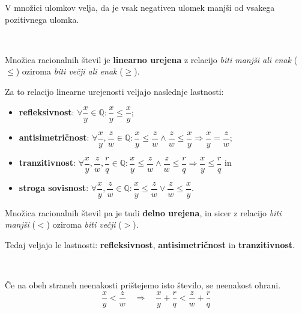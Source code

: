                     

                    V množici ulomkov velja, da je vsak negativen ulomek manjši od vsakega pozitivnega ulomka.


                    ~

                    Množica racionalnih števil je \textbf{linearno urejena} z relacijo \textit{biti manjši ali enak} ($\leq$) oziroma \textit{biti večji ali enak} ($\geq$). 
                    
                    Za to relacijo linearne urejenosti veljajo naslednje lastnosti:

                    \begin{itemize}
                        \item \textbf{refleksivnost}: $\forall \dfrac{x}{y}\in\mathbb{Q}: \dfrac{x}{y}\leq\dfrac{x}{y}$;
                        \item \textbf{antisimetričnost}: $\forall \dfrac{x}{y},\dfrac{z}{w}\in\mathbb{Q}: \dfrac{x}{y}\leq\dfrac{z}{w}  \land \dfrac{z}{w}\leq\dfrac{x}{y} \Rightarrow \dfrac{x}{y}=\dfrac{z}{w}$;
                        \item \textbf{tranzitivnost}: $\forall \dfrac{x}{y},\dfrac{z}{w},\dfrac{r}{q}\in\mathbb{Q}: \dfrac{x}{y}\leq\dfrac{z}{w}  \land \dfrac{z}{w}\leq\dfrac{r}{q} \Rightarrow \dfrac{x}{y}\leq\dfrac{r}{q}$ in 
                        \item \textbf{stroga sovisnost}: $\forall \dfrac{x}{y},\dfrac{z}{w}\in\mathbb{Q}: \dfrac{x}{y}\leq\dfrac{z}{w}  \lor \dfrac{z}{w}\leq\dfrac{x}{y}$.
                    \end{itemize}
    


                    Množica racionalnih števil pa je tudi \textbf{delno urejena}, in sicer z relacijo \textit{biti manjši} ($<$) oziroma \textit{biti večji} ($>$). 
                
                    Tedaj veljajo le lastnosti: \textbf{refleksivnost}, \textbf{antisimetričnost} in \textbf{tranzitivnost}.


                    
                    ~
            
               
                    Če na obeh straneh neenakosti prištejemo isto število, se neenakost ohrani.
                    $$ \dfrac{x}{y}<\dfrac{z}{w} \quad \Rightarrow \quad \dfrac{x}{y}+\dfrac{r}{q}<\dfrac{z}{w}+\dfrac{r}{q} $$

                    
                    

